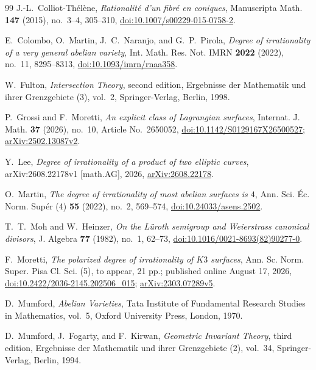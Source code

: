 \documentclass[12pt]{amsart}
\numberwithin{equation}{section}
\theoremstyle{definition}
\theoremstyle{remark}
\begin{document}
\begin{thebibliography}{99}
J.-L.~Colliot-Th\'el\`ene,
\emph{Rationalit\'e d'un fibr\'e en coniques},
Manuscripta Math. \textbf{147} (2015), no.~3--4, 305--310,
\href{https://doi.org/10.1007/s00229-015-0758-2}
{doi:10.1007/s00229-015-0758-2}.

E.~Colombo, O.~Martin, J.~C.~Naranjo, and G.~P.~Pirola,
\emph{Degree of irrationality of a very general abelian variety},
Int. Math. Res. Not. IMRN \textbf{2022} (2022), no.~11, 8295--8313,
\href{https://doi.org/10.1093/imrn/rnaa358}
{doi:10.1093/imrn/rnaa358}.

W.~Fulton,
\emph{Intersection Theory},
second edition, Ergebnisse der Mathematik und ihrer Grenzgebiete (3),
vol.~2, Springer-Verlag, Berlin, 1998.

P.~Grossi and F.~Moretti,
\emph{An explicit class of Lagrangian surfaces},
Internat. J. Math. \textbf{37} (2026), no.~10,
Article No.~2650052,
\href{https://doi.org/10.1142/S0129167X26500527}
{doi:10.1142/S0129167X26500527};
\href{https://arxiv.org/abs/2502.13087}{arXiv:2502.13087v2}.

Y.~Lee,
\emph{Degree of irrationality of a product of two elliptic curves},
arXiv:2608.22178v1 [math.AG], 2026,
\href{https://arxiv.org/abs/2608.22178}{arXiv:2608.22178}.

O.~Martin,
\emph{The degree of irrationality of most abelian surfaces is $4$},
Ann. Sci. \'Ec. Norm. Sup\'er (4) \textbf{55} (2022), no.~2,
569--574,
\href{https://doi.org/10.24033/asens.2502}
{doi:10.24033/asens.2502}.

T.~T.~Moh and W.~Heinzer,
\emph{On the L\"uroth semigroup and Weierstrass canonical divisors},
J. Algebra \textbf{77} (1982), no.~1, 62--73,
\href{https://doi.org/10.1016/0021-8693(82)90277-0}
{doi:10.1016/0021-8693(82)90277-0}.

F.~Moretti,
\emph{The polarized degree of irrationality of $K3$ surfaces},
Ann. Sc. Norm. Super. Pisa Cl. Sci. (5), to appear, 21 pp.;
published online August 17, 2026,
\href{https://doi.org/10.2422/2036-2145.202506_015}
{doi:10.2422/2036-2145.202506\_015};
\href{https://arxiv.org/abs/2303.07289}{arXiv:2303.07289v5}.

D.~Mumford,
\emph{Abelian Varieties},
Tata Institute of Fundamental Research Studies in Mathematics, vol.~5,
Oxford University Press, London, 1970.

D.~Mumford, J.~Fogarty, and F.~Kirwan,
\emph{Geometric Invariant Theory},
third edition, Ergebnisse der Mathematik und ihrer Grenzgebiete (2),
vol.~34, Springer-Verlag, Berlin, 1994.


\end{thebibliography}
\end{document}

